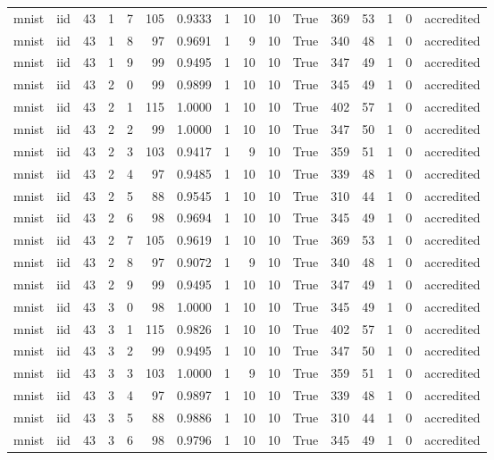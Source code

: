 \begin{tabular}{llrrrrrrrrrrrrrl}
mnist & iid & 43 & 1 & 7 & 105 & 0.9333 & 1 & 10 & 10 & True & 369 & 53 & 1 & 0 & accredited \\
mnist & iid & 43 & 1 & 8 & 97 & 0.9691 & 1 & 9 & 10 & True & 340 & 48 & 1 & 0 & accredited \\
mnist & iid & 43 & 1 & 9 & 99 & 0.9495 & 1 & 10 & 10 & True & 347 & 49 & 1 & 0 & accredited \\
mnist & iid & 43 & 2 & 0 & 99 & 0.9899 & 1 & 10 & 10 & True & 345 & 49 & 1 & 0 & accredited \\
mnist & iid & 43 & 2 & 1 & 115 & 1.0000 & 1 & 10 & 10 & True & 402 & 57 & 1 & 0 & accredited \\
mnist & iid & 43 & 2 & 2 & 99 & 1.0000 & 1 & 10 & 10 & True & 347 & 50 & 1 & 0 & accredited \\
mnist & iid & 43 & 2 & 3 & 103 & 0.9417 & 1 & 9 & 10 & True & 359 & 51 & 1 & 0 & accredited \\
mnist & iid & 43 & 2 & 4 & 97 & 0.9485 & 1 & 10 & 10 & True & 339 & 48 & 1 & 0 & accredited \\
mnist & iid & 43 & 2 & 5 & 88 & 0.9545 & 1 & 10 & 10 & True & 310 & 44 & 1 & 0 & accredited \\
mnist & iid & 43 & 2 & 6 & 98 & 0.9694 & 1 & 10 & 10 & True & 345 & 49 & 1 & 0 & accredited \\
mnist & iid & 43 & 2 & 7 & 105 & 0.9619 & 1 & 10 & 10 & True & 369 & 53 & 1 & 0 & accredited \\
mnist & iid & 43 & 2 & 8 & 97 & 0.9072 & 1 & 9 & 10 & True & 340 & 48 & 1 & 0 & accredited \\
mnist & iid & 43 & 2 & 9 & 99 & 0.9495 & 1 & 10 & 10 & True & 347 & 49 & 1 & 0 & accredited \\
mnist & iid & 43 & 3 & 0 & 98 & 1.0000 & 1 & 10 & 10 & True & 345 & 49 & 1 & 0 & accredited \\
mnist & iid & 43 & 3 & 1 & 115 & 0.9826 & 1 & 10 & 10 & True & 402 & 57 & 1 & 0 & accredited \\
mnist & iid & 43 & 3 & 2 & 99 & 0.9495 & 1 & 10 & 10 & True & 347 & 50 & 1 & 0 & accredited \\
mnist & iid & 43 & 3 & 3 & 103 & 1.0000 & 1 & 9 & 10 & True & 359 & 51 & 1 & 0 & accredited \\
mnist & iid & 43 & 3 & 4 & 97 & 0.9897 & 1 & 10 & 10 & True & 339 & 48 & 1 & 0 & accredited \\
mnist & iid & 43 & 3 & 5 & 88 & 0.9886 & 1 & 10 & 10 & True & 310 & 44 & 1 & 0 & accredited \\
mnist & iid & 43 & 3 & 6 & 98 & 0.9796 & 1 & 10 & 10 & True & 345 & 49 & 1 & 0 & accredited \\

\end{tabular}
